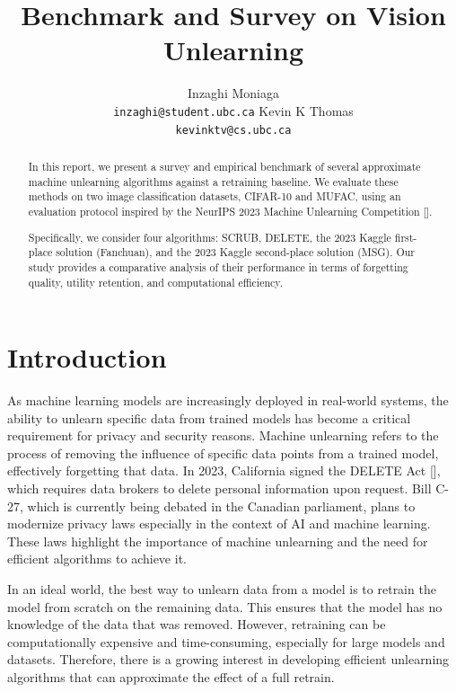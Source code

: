 \documentclass{article}
\title{Benchmark and Survey on Vision Unlearning}
\author{%
  Inzaghi Moniaga\\
  \texttt{inzaghi@student.ubc.ca}
  \And
  Kevin K Thomas\\
  \texttt{kevinktv@cs.ubc.ca}
}
\begin{document}
\maketitle
\begin{abstract}
In this report, we present a survey and empirical benchmark of several approximate machine unlearning algorithms against a retraining baseline. We evaluate these methods on two image classification datasets, CIFAR-10 and MUFAC, using an evaluation protocol inspired by the NeurIPS 2023 Machine Unlearning Competition [\cite{neurips-2023-machine-unlearning}].

Specifically, we consider four algorithms: SCRUB, DELETE, the 2023 Kaggle first-place solution (Fanchuan), and the 2023 Kaggle second-place solution (MSG). Our study provides a comparative analysis of their performance in terms of forgetting quality, utility retention, and computational efficiency.
\end{abstract}

\section{Introduction}
As machine learning models are increasingly deployed in real-world systems, the ability to unlearn specific data from trained models has become a critical requirement for privacy and security reasons. Machine unlearning refers to the process of removing the influence of specific data points from a trained model, effectively forgetting that data. 
In 2023, California signed the DELETE Act [\cite{delete_act}], which requires data brokers to delete personal information upon request. Bill C-27, which is currently being debated in the Canadian parliament, plans to modernize privacy laws especially in the context of AI and machine learning. These laws highlight the importance of machine unlearning and the need for efficient algorithms to achieve it.

In an ideal world, the best way to unlearn data from a model is to retrain the model from scratch on the remaining data. This ensures that the model has no knowledge of the data that was removed. However, retraining can be computationally expensive and time-consuming, especially for large models and datasets. Therefore, there is a growing interest in developing efficient unlearning algorithms that can approximate the effect of a full retrain.
\end{document}
